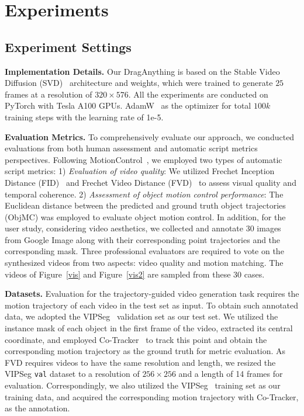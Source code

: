 \documentclass[runningheads]{llncs}
\newcommand{\ours}{\textup{DragAnything}\xspace}
\begin{document}
\section{Experiments}

\subsection{Experiment Settings}

\textbf{Implementation Details.} 
%
Our \ours is based on the Stable Video Diffusion (SVD)~\cite{blattmann2023stable} architecture and weights, which were trained to generate $25$ frames at a resolution of $320\times576$.
%
All the experiments are conducted on PyTorch with Tesla A100 GPUs.
%
AdamW~\cite{loshchilov2017decoupled} as the optimizer for total $100k$ training steps with the learning rate of 1e\mbox{-}5. 
%
%


\textbf{Evaluation Metrics.}
To comprehensively evaluate our approach, we conducted evaluations from both human assessment and automatic script metrics perspectives. 
%
Following MotionControl~\cite{wang2023motionctrl}, we employed two types of automatic script metrics:
%
1) \textit{Evaluation of video quality}: We utilized Frechet Inception Distance (FID)~\cite{fid} and Frechet Video Distance (FVD)~\cite{fvd} to assess visual quality and temporal coherence.
%
2) \textit{Assessment of object motion control performance}: The Euclidean distance between the predicted and ground truth object trajectories (ObjMC) was employed to evaluate object motion control.
%
In addition, for the user study, considering video aesthetics, we collected and annotate $30$ images from Google Image along with their corresponding point trajectories and the corresponding mask.
%
Three professional evaluators are required to vote on the synthesized videos from two aspects: video quality and motion matching.
%
The videos of Figure~\ref{vis} and Figure~\ref{vis2} are sampled from these $30$ cases.

\textbf{Datasets.} Evaluation for the trajectory-guided video generation task requires the motion trajectory of each video in the test set as input.
%
To obtain such annotated data, we adopted the VIPSeg~\cite{miao2022large} validation set as our test set. 
%
We utilized the instance mask of each object in the first frame of the video, extracted its central coordinate, and employed Co-Tracker~\cite{karaev2023cotracker} to track this point and obtain the corresponding motion trajectory as the ground truth for metric evaluation.
%
As FVD requires videos to have the same resolution and length, we resized the VIPSeg \texttt{val} dataset to a resolution of $256 \times 256$ and a length of 14 frames for evaluation.
%
Correspondingly, we also utilized the VIPSeg~\cite{miao2022large} training set as our training data, and acquired the corresponding motion trajectory with Co-Tracker, as the annotation.
%
\end{document}
